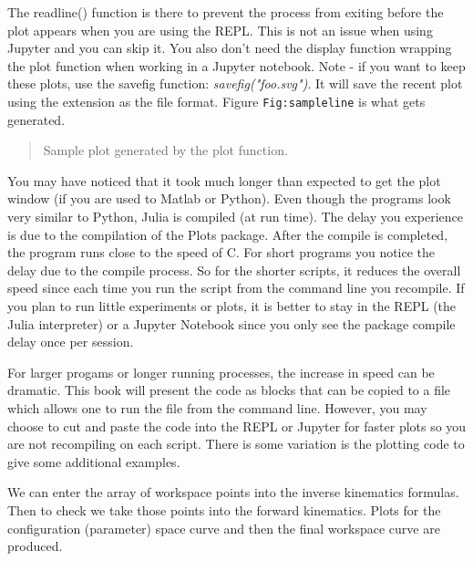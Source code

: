 The readline() function is there to prevent the process from exiting
before the plot appears when you are using the REPL. This is not an
issue when using Jupyter and you can skip it. You also don't need the
display function wrapping the plot function when working in a Jupyter
notebook. Note - if you want to keep these plots, use the savefig
function: \emph{savefig("foo.svg")}. It will save the recent plot using
the extension as the file format. Figure \texttt{Fig:sampleline} is what
gets generated.

\begin{quote}
Sample plot generated by the plot function.
\end{quote}

You may have noticed that it took much longer than expected to get the
plot window (if you are used to Matlab or Python). Even though the
programs look very similar to Python, Julia is compiled (at run time).
The delay you experience is due to the compilation of the Plots package.
After the compile is completed, the program runs close to the speed of
C. For short programs you notice the delay due to the compile process.
So for the shorter scripts, it reduces the overall speed since each time
you run the script from the command line you recompile. If you plan to
run little experiments or plots, it is better to stay in the REPL (the
Julia interpreter) or a Jupyter Notebook since you only see the package
compile delay once per session.

For larger progams or longer running processes, the increase in speed
can be dramatic. This book will present the code as blocks that can be
copied to a file which allows one to run the file from the command line.
However, you may choose to cut and paste the code into the REPL or
Jupyter for faster plots so you are not recompiling on each script.
There is some variation is the plotting code to give some additional
examples.

We can enter the array of workspace points into the inverse kinematics
formulas. Then to check we take those points into the forward
kinematics. Plots for the configuration (parameter) space curve and then
the final workspace curve are produced.

